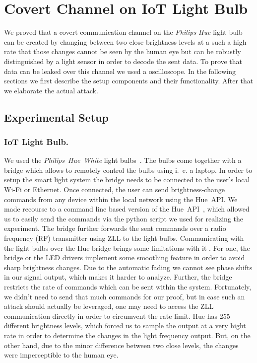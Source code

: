 \section{Covert Channel on IoT Light Bulb} %
\label{sec:experiment}

We proved that a covert communication channel on the \textit{Philips Hue} light bulb can be created by changing between two close brightness levels at a such a high rate that those changes cannot be seen by the human eye but can be robustly distinguished by a light sensor in order to decode the sent data. To prove that data can be leaked over this channel we used a oscilloscope. In the following sections we first describe the setup components and their functionality. After that we elaborate the actual attack.\newline

\subsection{Experimental Setup} %
\label{sec:setup}


\subsubsection{IoT Light Bulb.} We used the \textit{Philips~Hue~White} light bulbs~\cite{Philips:2018:Hue}. The bulbs come together with a bridge which allows to remotely control the bulbs using i.~e. a laptop. In order to setup the smart light system the bridge needs to be connected to the user's local Wi-Fi or Ethernet. Once connected, the user can send brightness-change commands from any device within the local network using the Hue~API. We made recourse to a command line based version of the Hue~API~\cite{Bahamas10:2018:HueApi}, which allowed us to easily send the commands via the python script we used for realizing the experiment. The bridge further forwards the sent commands over a radio frequency (RF) transmitter using ZLL to the light bulbs.\newline
Communicating with the light bulbs over the Hue bridge brings some limitations with it \cite{Ronen:2016:EFAIDCSL}. For one, the bridge or the LED drivers implement some smoothing feature in order to avoid sharp brightness changes. Due to the automatic fading we cannot see phase shifts in our signal output, which makes it harder to analyze. Further, the bridge restricts the rate of commands which can be sent within the system. Fortunately, we didn't need to send that much commands for our proof, but in case such an attack should actually be leveraged, one may need to access the ZLL communication directly in order to circumvent the rate limit.\newline
Hue has 255 different brightness levels, which forced us to sample the output at a very hight rate in order to determine the changes in the light frequency output. But, on the other hand, due to the minor difference between two close levels, the changes were imperceptible to the human eye.


